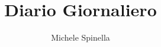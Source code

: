 \documentclass[a4paper,italian]{article}
\begin{document}
\title{Diario Giornaliero}


\author{Michele Spinella}

\maketitle
\tableofcontents{}






\end{document}
